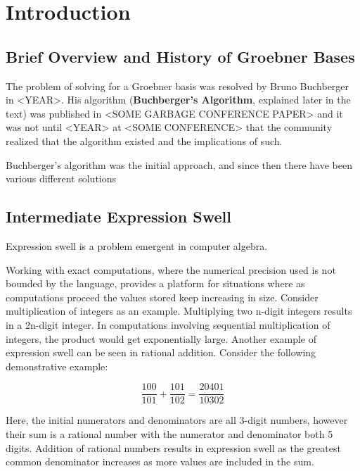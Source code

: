 \documentclass[letterpaper,12pt,titlepage,oneside,final]{book}
\begin{document}
\chapter{Introduction}

\section{Brief Overview and History of Groebner Bases}
 
The problem of solving for a Groebner basis was resolved by Bruno Buchberger in <YEAR>.  His algorithm (\textbf{Buchberger's Algorithm}, explained later in the text) was published in <SOME GARBAGE CONFERENCE PAPER> and it was not until <YEAR> at <SOME CONFERENCE> that the community realized that the algorithm existed and the implications of such.

Buchberger's algorithm was the initial approach, and since then there have been various different solutions 

\section{Intermediate Expression Swell}

Expression swell is a problem emergent in computer algebra.

Working with exact computations, where the numerical precision used is not bounded by the language, provides a platform for situations where as computations proceed the values stored keep increasing in size.  Consider multiplication of integers as an example.  Multiplying two n-digit integers results in a 2n-digit integer.  In computations involving sequential multiplication of integers, the product would get exponentially large.  Another example of expression swell can be seen in rational addition. Consider the following demonstrative example:

\begin{equation*}
  \frac{100}{101} + \frac{101}{102} = \frac{20401}{10302}
\end{equation*}

Here, the initial numerators and denominators are all 3-digit numbers, however their sum is a rational number with the numerator and denominator both 5 digits.  Addition of rational numbers results in expression swell as the greatest common denominator increases as more values are included in the sum.
\end{document}
